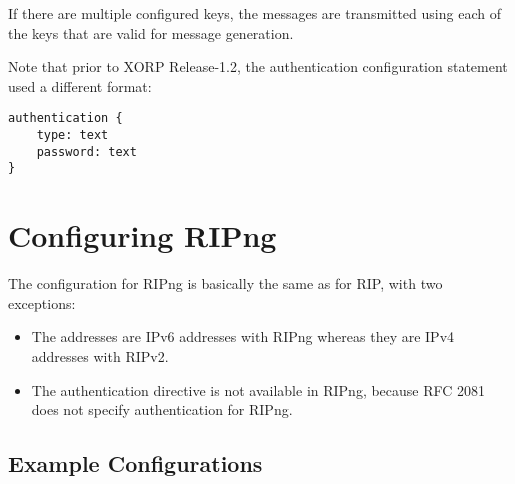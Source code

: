 \begin{description}
\begin{description}
\begin{description}
If there are multiple configured keys, the messages are transmitted
using each of the keys that are valid for message generation.

\end{description}

Note that prior to XORP Release-1.2, the authentication configuration
statement used a different format:
\begin{verbatim}
authentication {
    type: text
    password: text
}
\end{verbatim}

\end{description}
\end{description}

\section{Configuring RIPng}

The configuration for RIPng is basically the same as for RIP, with two
exceptions:
\begin{itemize}
\item The addresses are IPv6 addresses with RIPng whereas they are IPv4
  addresses with RIPv2.
\item The {\stt authentication} directive is not available in RIPng,
  because RFC 2081 does not specify authentication for RIPng.
\end{itemize}

\subsection{Example Configurations}

